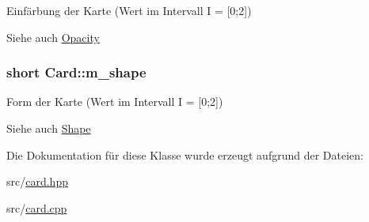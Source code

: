 Einfärbung der Karte (Wert im Intervall I = \mbox{[}0;2\mbox{]}) 

\begin{DoxySeeAlso}{Siehe auch}
\hyperlink{enums_8hpp_a31841bed26ecf2fc5a6253eb838aac4b}{Opacity} 
\end{DoxySeeAlso}
\hypertarget{class_card_a4e8799ebd7f3faff5c3998c67c106461}{}
\subsubsection[{m\+\_\+shape}]{\setlength{\rightskip}{0pt plus 5cm}short Card\+::m\+\_\+shape\hspace{0.3cm}{\ttfamily [protected]}}\label{class_card_a4e8799ebd7f3faff5c3998c67c106461}


Form der Karte (Wert im Intervall I = \mbox{[}0;2\mbox{]}) 

\begin{DoxySeeAlso}{Siehe auch}
\hyperlink{enums_8hpp_a55b506070847a13554f8b879c1bfb37c}{Shape} 
\end{DoxySeeAlso}


Die Dokumentation für diese Klasse wurde erzeugt aufgrund der Dateien\+:\begin{DoxyCompactItemize}
\item 
src/\hyperlink{card_8hpp}{card.\+hpp}\item 
src/\hyperlink{card_8cpp}{card.\+cpp}\end{DoxyCompactItemize}
